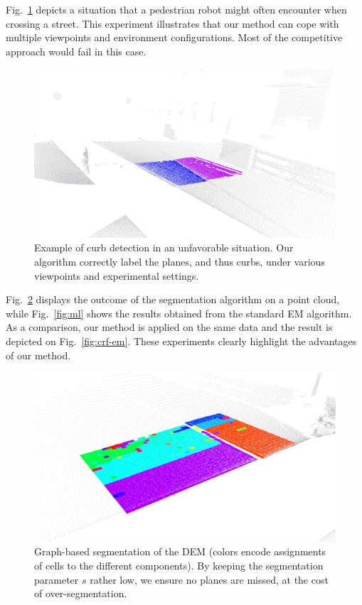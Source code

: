 Fig.~\ref{fig:special} depicts a situation that a pedestrian robot might often
encounter when crossing a street. This experiment illustrates that our method
can cope with multiple viewpoints and environment configurations. Most of the
competitive approach would fail in this case.

\begin{figure}[t]
\centering
\includegraphics[width=\columnwidth]{fig/special.eps}
\caption{Example of curb detection in an unfavorable situation. Our algorithm
correctly label the planes, and thus curbs, under various viewpoints and
experimental settings.}
\label{fig:special}
\end{figure}

Fig.~\ref{fig:segment} displays the outcome of the segmentation algorithm on a
point cloud, while Fig.~\ref{fig:ml} shows the results obtained from the
standard EM algorithm. As a comparison, our method is applied on the same data
and the result is depicted on Fig.~\ref{fig:crf-em}. These experiments clearly
highlight the advantages of our method.

\begin{figure}[t]
\centering
\includegraphics[width=\columnwidth]{fig/segment.eps}
\caption{Graph-based segmentation of the DEM (colors encode assignments of
cells to the different components). By keeping the segmentation parameter $s$
rather low, we ensure no planes are missed, at the cost of over-segmentation.}
\label{fig:segment}
\end{figure}


